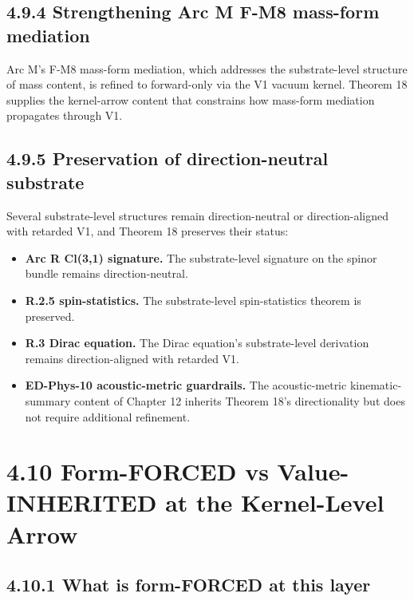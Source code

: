 \documentclass[11pt]{book}
\begin{document}
\subsection{4.9.4 Strengthening Arc M F-M8 mass-form mediation}

Arc M's F-M8 mass-form mediation, which addresses the substrate-level structure of mass content, is refined to forward-only via the V1 vacuum kernel. Theorem 18 supplies the kernel-arrow content that constrains how mass-form mediation propagates through V1.

\subsection{4.9.5 Preservation of direction-neutral substrate}

Several substrate-level structures remain direction-neutral or direction-aligned with retarded V1, and Theorem 18 preserves their status:

\begin{itemize}
\item \textbf{Arc R Cl(3,1) signature.} The substrate-level signature on the spinor bundle remains direction-neutral.
\item \textbf{R.2.5 spin-statistics.} The substrate-level spin-statistics theorem is preserved.
\item \textbf{R.3 Dirac equation.} The Dirac equation's substrate-level derivation remains direction-aligned with retarded V1.
\item \textbf{ED-Phys-10 acoustic-metric guardrails.} The acoustic-metric kinematic-summary content of Chapter 12 inherits Theorem 18's directionality but does not require additional refinement.
\end{itemize}

\section{4.10 Form-FORCED vs Value-INHERITED at the Kernel-Level Arrow}

\subsection{4.10.1 What is form-FORCED at this layer}
\end{document}
